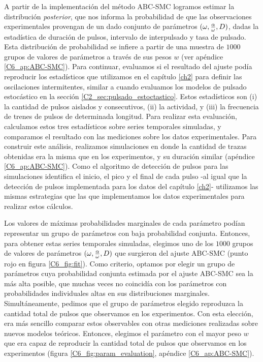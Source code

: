 \documentclass[./main.tex]{subfiles}
\begin{document}
A partir de la implementación del método ABC-SMC logramos estimar la distribución \textit{posterior}, que nos informa la probabilidad de que las observaciones experimentales provengan de un dado conjunto de parámetros $(\omega,\frac{\alpha}{\omega},D)$, dadas la estadística de duración de pulsos, intervalo de interpulsado y tasa de pulsado. Esta distribución de probabilidad se infiere a partir de una muestra de $1000$ grupos de valores de parámetros a través de sus pesos $w$ (ver apéndice \ref{C6_ap:ABC-SMC}). Para continuar, evaluamos si el resultado del ajuste podía reproducir los estadísticos que utilizamos en el capítulo \ref{ch2} para definir las oscilaciones intermitentes, similar a cuando evaluamos los modelos de pulsado estocástico en la sección \ref{C2_sec:pulsado_estoctastico}. Estos estadísticos son (i) la cantidad de pulsos aislados y consecutivos, (ii) la actividad, y (iii) la frecuencia de trenes de pulsos de determinada longitud. Para realizar esta evaluación, calculamos estos tres estadísticos sobre series temporales simuladas, y comparamos el resultado con las mediciones sobre los datos experimentales. Para construir este análisis, realizamos simulaciones en donde la cantidad de trazas obtenidas era la misma que en los experimentos, y su duración similar (apéndice \ref{C6_ap:ABC-SMC}). Como el algoritmo de detección de pulsos para las simulaciones identifica el inicio, el pico y el final de cada pulso -al igual que la detección de pulsos implementada para los datos del capítulo \ref{ch2}- utilizamos las mismas estrategias que las que implementamos los datos experimentales para realizar estos cálculos. 


Los valores de máximas probabilidades marginales de cada parámetro podían representar un grupo de parámetros con baja probabilidad conjunta. Entonces, para obtener estas series temporales simuladas, elegimos uno de los $1000$ grupos de valores de parámetros $(\omega,\frac{\alpha}{\omega},D)$ que surgieron del ajuste ABC-SMC (punto rojo en figura \ref{C6_fig:fit}). Como criterio, optamos por elegir un grupo de parámetros cuya probabilidad conjunta estimada por el ajuste ABC-SMC sea la más alta posible, que muchas veces no coincidía con los parámetros con probabilidades individuales altas en sus distribuciones marginales. Simultáneamente, pedimos que el grupo de parámetros elegido reproduzca la cantidad total de pulsos que observamos en los experimentos. Con esta elección, era más sencillo comparar estos observables con otras mediciones realizadas sobre nuevos modelos teóricos. Entonces, elegimos el parámetro con el mayor peso $w$ que era capaz de reproducir la cantidad total de pulsos que observamos en los experimentos (figura \ref{C6_fig:param_evaluation}, apéndice \ref{C6_ap:ABC-SMC}). 
\end{document}
